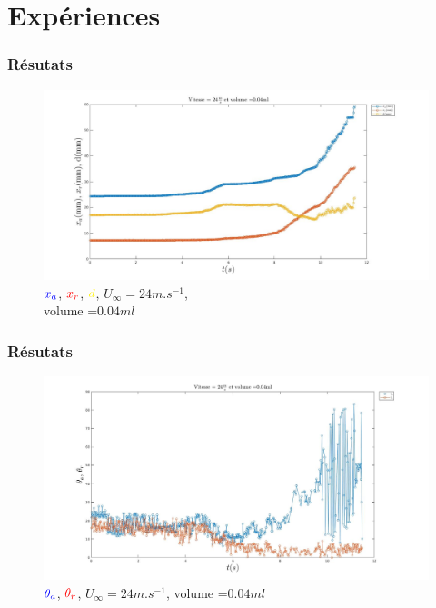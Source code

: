 \documentclass{beamer}
\begin{document}
\section{Expériences}\label{sec:experience}
\begin{frame}
\frametitle{Résutats}
\begin{figure}[!ht]
	\centering
		\includegraphics[width=\linewidth]{./image/v=24_vol=004_xaxrd.jpg}
		\caption{$\textcolor{blue}{x_{a}}$,
		$\textcolor{red}{x_{r}}$, $\textcolor{yellow}{d}$, 
		$U_{\infty}=24m.s^{-1}$, \\
                volume =$0.04ml$}
		\label{fig:entre_xaxrd}
		 \end{figure}
\end{frame}
\begin{frame}
\frametitle{Résutats}
\begin{figure}[!ht]
		\includegraphics[width=\linewidth]{./image/v=24_vol=004_oaor.jpg}
		\caption{$\textcolor{blue}{\theta_{a}}$,
		$\textcolor{red}{\theta_{r}}$, $U_{\infty}=24m.s^{-1}$, volume =$0.04ml$}
		\label{fig:entre_oaor}
 \end{figure}
\end{frame}
\end{document}

